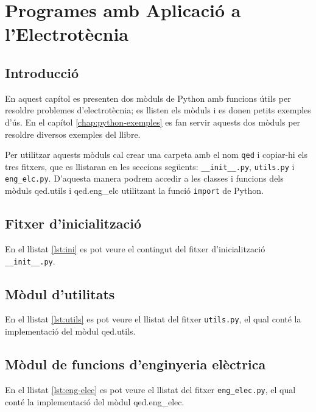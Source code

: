 \chapter{Programes amb Aplicació a l'Electrotècnia}\label{chap:python-programes}

\section{Introducció}

En aquest capítol es presenten dos mòduls de Python amb funcions útils per resoldre problemes d'electrotècnia; es llisten els  mòduls i es donen petits exemples d'ús. En el capítol \ref{chap:python-exemples} es fan servir aquests dos mòduls per resoldre diversos exemples del llibre.

Per utilitzar aquests mòduls cal crear una carpeta amb el nom \texttt{qed} i copiar-hi els tres fitxers, que es llistaran en les seccions següents: \texttt{\_\_init\_\_.py}, \texttt{utils.py} i \texttt{eng\_elc.py}. D'aquesta manera podrem accedir a les classes i funcions dels mòduls qed.utils i qed.eng\_elc utilitzant la funció \texttt{import} de Python.



\section{Fitxer d'inicialització}
En el llistat \vref{lst:ini} es pot veure el contingut del fitxer d'inicialització  \texttt{\_\_init\_\_.py}.



\section{Mòdul d'utilitats}
En el llistat \vref{lst:utils} es pot veure el llistat del fitxer \texttt{utils.py}, el qual conté la implementació del mòdul qed.utils.



\section{Mòdul de funcions d'enginyeria elèctrica}
En el llistat \vref{lst:eng-elec} es pot veure el llistat del fitxer \texttt{eng\_elec.py}, el qual conté la implementació del mòdul qed.eng\_elec.

